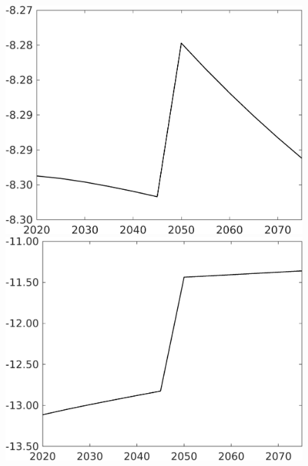 \documentclass[12pt]{article}
\begin{document}
\begin{figure}[h!!]
\begin{minipage}[]{0.32\textwidth}
	\end{minipage}
	\begin{minipage}[]{0.32\textwidth}
		\includegraphics[width=1\textwidth]{../../codding_model/own_basedOnFried/optimalPol_010922_revision/figures/all_13Sept22/CompTaufPER_bytaul_Reg0_Ln_spillover0_nsk0_xgr0_knspil1_sep0_LFlimit1_emsbase0_countec0_GovRev0_etaa0.79_lgd0.png}
	\end{minipage}			
	\begin{minipage}[]{0.32\textwidth}
		\includegraphics[width=1\textwidth]{../../codding_model/own_basedOnFried/optimalPol_010922_revision/figures/all_13Sept22/CompTaufPER_bytaul_Reg0_GFF_spillover0_nsk0_xgr0_knspil1_sep0_LFlimit1_emsbase0_countec0_GovRev0_etaa0.79_lgd0.png}

\end{minipage}
\end{figure}
\end{document}
